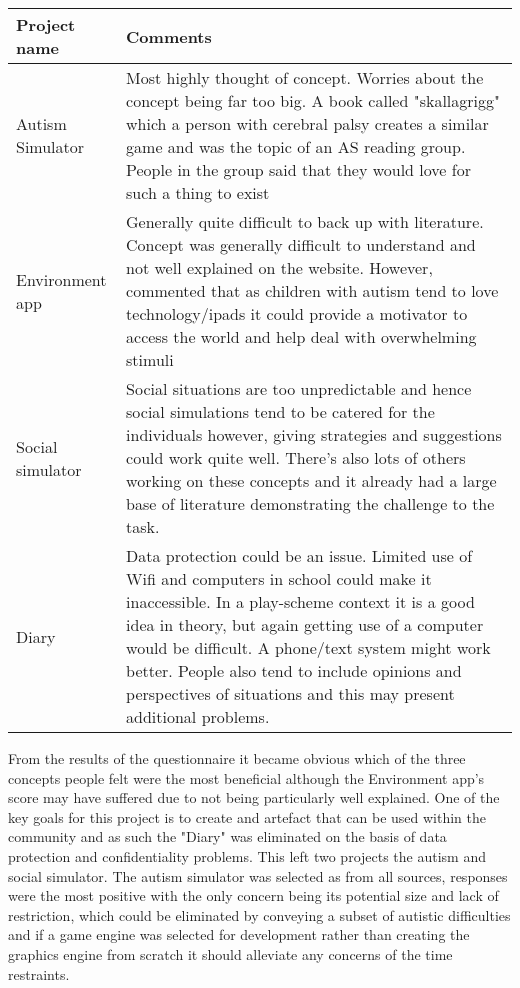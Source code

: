 \documentclass[11pt]{report}
\begin{document}
\begin{table}[H]
    \begin{tabular}{| p{3cm} | p{12cm} |}
    \hline
    Project name & Comments \\ \hline
    Autism Simulator & Most highly thought of concept. Worries about the concept being far too big. A book called "skallagrigg" which a person with cerebral palsy creates a similar game and was the topic of an AS reading group. People in the group said that they would love for such a thing to exist\\ \hline
    Environment app & Generally quite difficult to back up with literature. Concept was generally difficult to understand and not well explained on the website. However, commented that as children with autism tend to love technology/ipads it could provide a motivator to access the world and help deal with overwhelming stimuli\\ \hline
    Social simulator & Social situations are too unpredictable and hence social simulations tend to be catered for the individuals however, giving strategies and suggestions could work quite well. There's also lots of others working on these concepts and it already had a large base of literature demonstrating the challenge to the task. \\ \hline
    Diary & Data protection could be an issue. Limited use of Wifi and computers in school could make it inaccessible. In a play-scheme context it is a good idea in theory, but again getting use of a computer would be difficult. A phone/text system might work better. People also tend to include opinions and perspectives of situations and this may present additional problems. \\ \hline
    \end{tabular}
\end{table}

From the results of the questionnaire it became obvious which of the three concepts people felt were the most beneficial although the Environment app's score may have suffered due to not being particularly well explained. One of the key goals for this project is to create and artefact that can be used within the community and as such the "Diary" was eliminated on the basis of data protection and confidentiality problems. This left two projects the autism and social simulator. The autism simulator was selected as from all sources, responses were the most positive with the only concern being its potential size and lack of restriction, which could be eliminated by conveying a subset of autistic difficulties and if a game engine was selected for development rather than creating the graphics engine from scratch it should alleviate any concerns of the time restraints.
\end{document}
